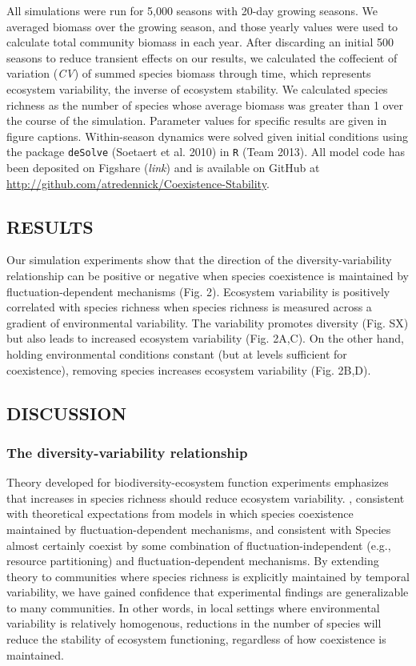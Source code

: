 \documentclass[12pt,]{article}
\begin{document}
All simulations were run for 5,000 seasons with 20-day growing seasons.
We averaged biomass over the growing season, and those yearly values
were used to calculate total community biomass in each year. After
discarding an initial 500 seasons to reduce transient effects on our
results, we calculated the coffecient of variation (\emph{CV}) of summed
species biomass through time, which represents ecosystem variability,
the inverse of ecosystem stability. We calculated species richness as
the number of species whose average biomass was greater than 1 over the
course of the simulation. Parameter values for specific results are
given in figure captions. Within-season dynamics were solved given
initial conditions using the package \texttt{deSolve} (Soetaert et al.
2010) in \texttt{R} (Team 2013). All model code has been deposited on
Figshare (\emph{link}) and is available on GitHub at
\url{http://github.com/atredennick/Coexistence-Stability}.

\subsection{RESULTS}\label{results}

Our simulation experiments show that the direction of the
diversity-variability relationship can be positive or negative when
species coexistence is maintained by fluctuation-dependent mechanisms
(Fig. 2). Ecosystem variability is positively correlated with species
richness when species richness is measured across a gradient of
environmental variability. The variability promotes diversity (Fig. SX)
but also leads to increased ecosystem variability (Fig. 2A,C). On the
other hand, holding environmental conditions constant (but at levels
sufficient for coexistence), removing species increases ecosystem
variability (Fig. 2B,D).

\subsection{DISCUSSION}\label{discussion}

\subsubsection{The diversity-variability
relationship}\label{the-diversity-variability-relationship}

Theory developed for biodiversity-ecosystem function experiments
emphasizes that increases in species richness should reduce ecosystem
variability. , consistent with theoretical expectations from models in
which species coexistence maintained by fluctuation-dependent
mechanisms, and consistent with Species almost certainly coexist by some
combination of fluctuation-independent (e.g., resource partitioning) and
fluctuation-dependent mechanisms. By extending theory to communities
where species richness is explicitly maintained by temporal variability,
we have gained confidence that experimental findings are generalizable
to many communities. In other words, in local settings where
environmental variability is relatively homogenous, reductions in the
number of species will reduce the stability of ecosystem functioning,
regardless of how coexistence is maintained.
\end{document}

